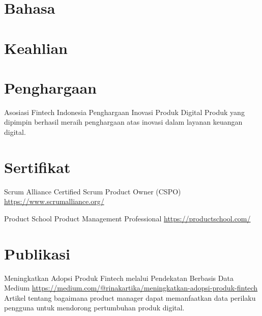 \documentclass[a4paper, serif, 10pt]{moderncv}
\begin{document}
\section{Bahasa}

\section{Keahlian}

\section{Penghargaan}

        {Asosiasi Fintech Indonesia}
        {Penghargaan Inovasi Produk Digital}
        {}
        {}
        {Produk yang dipimpin berhasil meraih penghargaan atas inovasi dalam layanan keuangan digital.}
\section{Sertifikat}

        {Scrum Alliance}
        {Certified Scrum Product Owner (CSPO)}
        {\url{https://www.scrumalliance.org/}}
        {}
        {}

        {Product School}
        {Product Management Professional}
        {\url{https://productschool.com/}}
        {}
        {}
\section{Publikasi}

        {Meningkatkan Adopsi Produk Fintech melalui Pendekatan Berbasis Data}
        {Medium}
        {\url{https://medium.com/@rinakartika/meningkatkan-adopsi-produk-fintech}}
        {}
        {Artikel tentang bagaimana product manager dapat memanfaatkan data perilaku pengguna untuk mendorong pertumbuhan produk digital.}
\end{document}

